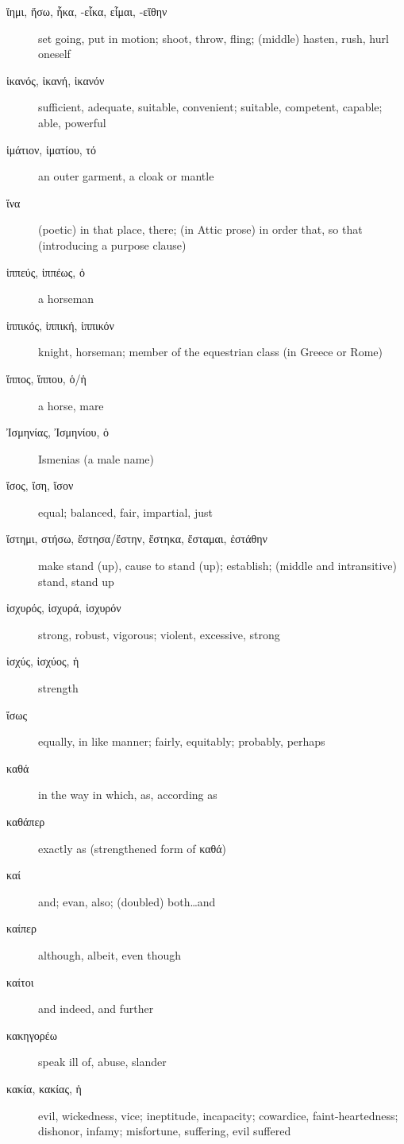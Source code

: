 \documentclass[12pt,letterpaper]{article}
\begin{document}
\begin{description}
    \item[\textgreek{ἵημι, ἥσω, ἧκα, -εἷκα, εἷμαι, -εἵθην}] \marginnote{*}set going, put in motion; shoot, throw, fling; (middle) hasten, rush, hurl oneself
    \item[\textgreek{ἱκανός, ἱκανή, ἱκανόν}] \marginnote{*}sufficient, adequate, suitable, convenient; suitable, competent, capable; able, powerful
    \item[\textgreek{ἱμάτιον, ἱματίου, τό}] an outer garment, a cloak or mantle
    \item[\textgreek{ἵνα}] \marginnote{*}(poetic) in that place, there; (in Attic prose) in order that, so that (introducing a purpose clause)
    \item[\textgreek{ἱππεύς, ἱππέως, ὁ}] \marginnote{*}a horseman
    \item[\textgreek{ἱππικός, ἱππική, ἱππικόν}] knight, horseman; member of the equestrian class (in Greece or Rome)
    \item[\textgreek{ἵππος, ἵππου, ὁ/ἡ}] \marginnote{*}a horse, mare
    \item[\textgreek{Ἰσμηνίας, Ἰσμηνίου, ὁ}] Ismenias (a male name)
    \item[\textgreek{ἴσος, ἴση, ἴσον}] \marginnote{*}equal; balanced, fair, impartial, just
    \item[\textgreek{ἵστημι, στήσω, ἔστησα/ἔστην, ἕστηκα, ἕσταμαι, ἐστάθην}] \marginnote{*}make stand (up), cause to stand (up); establish; (middle and intransitive) stand, stand up
    \item[\textgreek{ἰσχυρός, ἰσχυρά, ἰσχυρόν}] \marginnote{*}strong, robust, vigorous; violent, excessive, strong
    \item[\textgreek{ἰσχύς, ἰσχύος, ἡ}] strength
    \item[\textgreek{ἴσως}] \marginnote{*}equally, in like manner; fairly, equitably; probably, perhaps
    \item[\textgreek{καθά}] in the way in which, as, according as
    \item[\textgreek{καθάπερ}] exactly as (strengthened form of \textgreek{καθά})
    \item[\textgreek{καί}] \marginnote{*}and; evan, also; (doubled) both\dots and
    \item[\textgreek{καίπερ}] although, albeit, even though
    \item[\textgreek{καίτοι}] \marginnote{*}and indeed, and further
    \item[\textgreek{κακηγορέω}] speak ill of, abuse, slander
    \item[\textgreek{κακία, κακίας, ἡ}] evil, wickedness, vice; ineptitude, incapacity; cowardice, faint-heartedness; dishonor, infamy; misfortune, suffering, evil suffered

\end{description}
\end{document}
